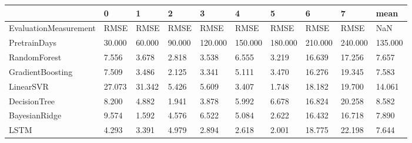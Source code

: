 \begin{tabular}{llllllllll}
\toprule
{} &      0 &      1 &      2 &       3 &       4 &       5 &       6 &       7 &    mean \\
\midrule
EvaluationMeasurement &   RMSE &   RMSE &   RMSE &    RMSE &    RMSE &    RMSE &    RMSE &    RMSE &     NaN \\
PretrainDays          & 30.000 & 60.000 & 90.000 & 120.000 & 150.000 & 180.000 & 210.000 & 240.000 & 135.000 \\
RandomForest          &  7.556 &  3.678 &  2.818 &   3.538 &   6.555 &   3.219 &  16.639 &  17.256 &   7.657 \\
GradientBoosting      &  7.509 &  3.486 &  2.125 &   3.341 &   5.111 &   3.470 &  16.276 &  19.345 &   7.583 \\
LinearSVR             & 27.073 & 31.342 &  5.426 &   5.609 &   3.407 &   1.748 &  18.182 &  19.700 &  14.061 \\
DecisionTree          &  8.200 &  4.882 &  1.941 &   3.878 &   5.992 &   6.678 &  16.824 &  20.258 &   8.582 \\
BayesianRidge         &  9.574 &  1.592 &  4.576 &   6.522 &   5.084 &   2.622 &  16.432 &  16.718 &   7.890 \\
LSTM                  &  4.293 &  3.391 &  4.979 &   2.894 &   2.618 &   2.001 &  18.775 &  22.198 &   7.644 \\
\bottomrule
\end{tabular}
